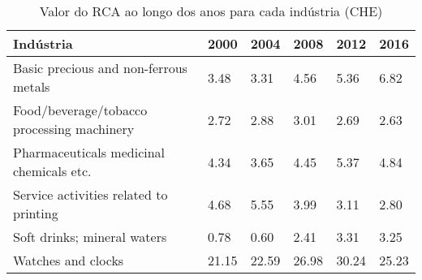 \begin{table}
\centering
\caption{Valor do RCA ao longo dos anos para cada indústria (CHE)}
\label{tab:ex3-tempo-CHE}
\begin{tabular}{p{6cm}p{1.5cm}p{1.5cm}p{1.5cm}p{1.5cm}p{1.5cm}}
\toprule
                                 Indústria &  2000 &  2004 &  2008 &  2012 &  2016 \\
\midrule
     Basic precious and non-ferrous metals &  3.48 &  3.31 &  4.56 &  5.36 &  6.82 \\
Food/beverage/tobacco processing machinery &  2.72 &  2.88 &  3.01 &  2.69 &  2.63 \\
  Pharmaceuticals medicinal chemicals etc. &  4.34 &  3.65 &  4.45 &  5.37 &  4.84 \\
    Service activities related to printing &  4.68 &  5.55 &  3.99 &  3.11 &  2.80 \\
               Soft drinks; mineral waters &  0.78 &  0.60 &  2.41 &  3.31 &  3.25 \\
                        Watches and clocks & 21.15 & 22.59 & 26.98 & 30.24 & 25.23 \\
\bottomrule
\end{tabular}
\end{table}
